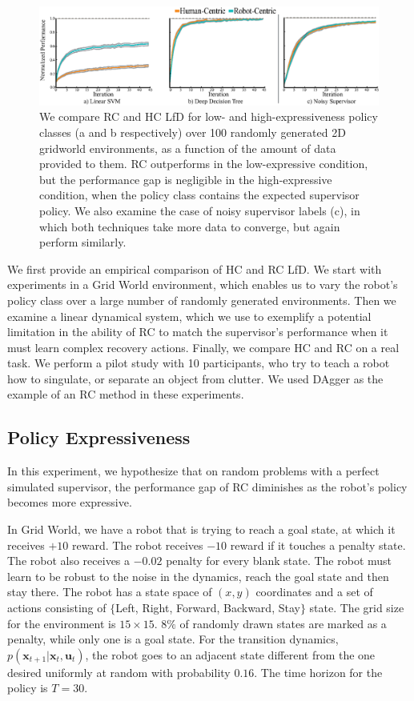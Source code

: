 \documentclass[10pt, conference]{ieeeconf}      %
\newcommand{\bu}{\mathbf{u}}
\newcommand{\bx}{\mathbf{x}}
\begin{document}
\begin{figure}
\includegraphics{f_figs/var_grid.eps}
\caption{
    \footnotesize
We compare RC and HC LfD for low- and high-expressiveness policy classes (a and b respectively) over 100 randomly generated 2D gridworld environments, as a function of the amount of data provided to them. RC outperforms in the low-expressive condition, but the performance gap is negligible in the high-expressive condition, when the policy class contains the expected supervisor policy. We also examine the case of noisy supervisor labels (c), in which both techniques take more data to converge, but again perform similarly. 
}
\vspace*{-20pt}
\label{fig:var}
\end{figure}

We first provide an empirical comparison of HC and RC LfD.
We start with experiments in a Grid World environment, which enables us to vary the robot's policy class over a large number of randomly generated environments. Then we examine a linear dynamical system, which we use to exemplify a potential limitation in the ability of RC to match the supervisor's performance when it must learn complex recovery actions.
Finally, we compare HC and RC on a real task. We perform a pilot study with 10 participants, who try to teach a robot how to singulate, or separate an object from clutter. We used DAgger as the example of an RC method in these experiments. 

\subsection{Policy Expressiveness}\label{sec:gdw}
In this experiment, we hypothesize that on random problems with a perfect simulated supervisor, the performance gap of RC diminishes as the robot's policy becomes more expressive. 

In Grid World, we have a robot that is trying to reach a goal state, at which it receives $+10$ reward. The robot receives $-10$ reward if it touches a penalty state. The robot also receives a $-0.02$ penalty for every blank state. The robot must learn to be robust to the noise in the dynamics, reach the goal state and then stay there.
The robot has a state space of $(x,y)$ coordinates and a set of actions consisting of $\lbrace$Left, Right, Forward, Backward, Stay$\rbrace$ state. The grid size for the environment is $15 \times 15$. $8\%$ of randomly drawn states are marked as a penalty, while only one is a goal state. For the transition dynamics, $p(\bx_{t+1}|\bx_{t},\bu_t)$, the robot goes to an adjacent state different from the one desired uniformly at random with probability $0.16$. The time horizon for the policy is $T=30$. 
\end{document}
